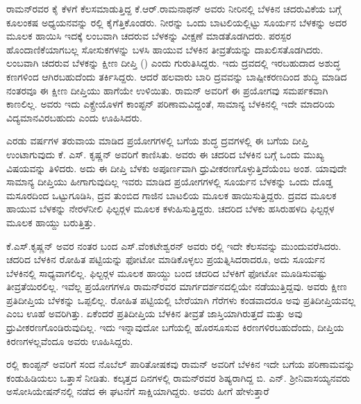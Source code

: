 
ರಾಮನ್‍ರವರ ಕೈ ಕೆಳಗೆ ಕೆಲಸಮಾಡುತ್ತಿದ್ದ ಕೆ.ಆರ್.ರಾಮನಾಥನ್ ಅವರು ನೀರಿನಲ್ಲಿ ಬೆಳಕಿನ ಚದರುವಿಕೆಯ ಬಗ್ಗೆ ಕೂಲಂಕಷ ಅಧ್ಯಯನವನ್ನು ರಲ್ಲಿ ಕೈಗೆತ್ತಿಕೊಂಡರು. ನೀರನ್ನು ಒಂದು ಬಾಟಲಿಯಲ್ಲಿಟ್ಟು ಸೂರ್ಯನ ಬೆಳಕನ್ನು ಅದರ ಮೂಲಕ ಹಾಯಿಸಿ ಇದಕ್ಕೆ ಲಂಬವಾಗಿ ಚದರುವ ಬೆಳಕನ್ನು ವೀಕ್ಷಣೆ ಮಾಡತೊಡಗಿದರು. ಪರಸ್ಪರ ಹೊಂದಾಣಿಕೆಯಾಗಬಲ್ಲ ಸೋಸುಕಗಳನ್ನು ಬಳಸಿ ಹಾಯುವ ಬೆಳಕಿನ ತೀವ್ರತೆಯನ್ನು ದಾಖಲಿಸತೊಡಗಿದರು. ಲಂಬವಾಗಿ ಚದರುವ ಬೆಳಕನ್ನು ಕ್ಷೀಣ ದೀಪ್ತಿ () ಎಂದು ಗುರುತಿಸಿದ್ದರು. ಇದು ದ್ರವದಲ್ಲಿ ಇರಬಹುದಾದ ಅಶುದ್ಧ ಕಣಗಳಿಂದ ಆಗಿರಬಹುದೆಂದು ತರ್ಕಿಸಿದ್ದರು. ಆದರೆ ಹಲವಾರು ಬಾರಿ ದ್ರವವನ್ನು ಬಾಷ್ಪೀಕರಣದಿಂದ ಶುದ್ಧಿ ಮಾಡಿದ ನಂತರವೂ ಈ ಕ್ಷೀಣ ದೀಪ್ತಿಯು ಹಾಗೆಯೇ ಉಳಿಯಿತು. ರಾಮನ್ ಅವರಿಗೆ ಈ ಪ್ರಯೋಗವು ಸಮರ್ಪಕವಾಗಿ ಕಾಣಲಿಲ್ಲ. ಅವರು ಇದು ಎಕ್ಸ್\enginline{-}ರೇಯೊಳಗೆ ಕಾಂಪ್ಟನ್ ಪರಿಣಾಮವಿದ್ದಂತೆ, ಸಾಮಾನ್ಯ ಬೆಳಕಿನಲ್ಲಿ ಇದೇ ಮಾದರಿಯ ವಿದ್ಯಮಾನವಿರಬಹುದು ಎಂದು ಊಹಿಸಿದರು.

ಎರಡು ವರ್ಷಗಳ ತರುವಾಯ ಮಾಡಿದ ಪ್ರಯೋಗಗಳಲ್ಲಿ  ಬಗೆಯ ಶುದ್ಧ ದ್ರವಗಳಲ್ಲಿ ಈ ಬಗೆಯ ದೀಪ್ತಿ ಉಂಟಾಗುವುದು ಕೆ. ಎಸ್. ಕೃಷ್ಣನ್ ಅವರಿಗೆ ಕಾಣಿಸಿತು. ಅವರು ಈ ಚದರಿದ ಬೆಳಕಿನ ಬಗ್ಗೆ ಒಂದು ಮುಖ್ಯ ವಿಷಯವನ್ನು ತಿಳಿದರು. ಅದು ಈ ದೀಪ್ತಿ ಬೆಳಕು ಅಪೂರ್ಣವಾಗಿ ಧ್ರುವೀಕರಣಗೊಳ್ಳುತ್ತಿದೆಯೆಂಬ ಅಂಶ. ಯಾವುದೇ ಸಾಮಾನ್ಯ ದೀಪ್ತಿಯು ಹೀಗಾಗುವುದಿಲ್ಲ ಇವರು ಮಾಡಿದ ಪ್ರಯೋಗಗಳಲ್ಲಿ ಸೂರ್ಯನ ಬೆಳಕನ್ನು ಒಂದು ದೊಡ್ಡ ಮಸೂರದಿಂದ ಒಟ್ಟುಗೂಡಿಸಿ, ದ್ರವ ತುಂಬಿದ ಗಾಜಿನ ಬಾಟಲಿಯ ಮೂಲಕ ಹಾಯಿಸುತ್ತಿದ್ದರು. ದ್ರವದ ಮೂಲಕ ಹಾಯುವ ಬೆಳಕನ್ನು ನೇರಳೆ\enginline{-}ನೀಲಿ ಫಿಲ್ಟರ್‍ಗಳ ಮೂಲಕ ಕಳುಹಿಸುತ್ತಿದ್ದರು. ಚದರಿದ ಬೆಳಕು ಹಸಿರು\enginline{-}ಹಳದಿ ಫಿಲ್ಟರ್‍ಗಳ ಮೂಲಕ ಹಾಯ್ದು ಬರುತ್ತಿತ್ತು.

ಕೆ.ಎಸ್.ಕೃಷ್ಣನ್ ಅವರ ನಂತರ ಬಂದ ಎಸ್.ವೆಂಕಟೇಶ್ವರನ್ ಅವರು ರಲ್ಲಿ ಇದೇ ಕೆಲಸವನ್ನು ಮುಂದುವರೆಸಿದರು. ಚದರಿದ ಬೆಳಕಿನ ರೋಹಿತ ಪಟ್ಟಿಯನ್ನು ಫೋಟೋ ಮಾಡಿಕೊಳ್ಳಲು ಪ್ರಯತ್ನಿಸಿದರಾದರೂ, ಅದು ಸೂರ್ಯನ ಬೆಳಕಿನಲ್ಲಿ ಸಾಧ್ಯವಾಗಲಿಲ್ಲ. ಫಿಲ್ಟರ್‍ಗಳ ಮೂಲಕ ಹಾಯ್ದು ಬಂದ ಚದರಿದ ಬೆಳಕಿಗೆ ಫೋಟೋ ಮೂಡಿಸುವಷ್ಟು ತೀವ್ರತೆಯಿರಲಿಲ್ಲ. ಇವೆಲ್ಲ ಪ್ರಯೋಗಗಳೂ ರಾಮನ್‍ರವರ ಮಾರ್ಗದರ್ಶನದಲ್ಲಿಯೇ ನಡೆಯುತ್ತಿದ್ದವು. ಅವರು ಕ್ಷೀಣ ಪ್ರತಿದೀಪ್ತಿಯ ಬೆಳಕನ್ನು ಒಪ್ಪಲಿಲ್ಲ. ರೋಹಿತ ಪಟ್ಟಿಯಲ್ಲಿ ಬೇರೆಯಾಗಿ ಗೆರೆಗಳು ಕಂಡವಾದರೂ ಅವು ಪ್ರತಿದೀಪ್ತಿಯವಲ್ಲ ಎಂಬ ಊಹೆ ಅವರಿಗಿತ್ತು. ಏಕೆಂದರೆ ಪ್ರತಿದೀಪ್ತಿಯ ಬೆಳಕಿನ ತೀವ್ರತೆ ಜಾಸ್ತಿಯಾಗಿರುತ್ತದೆ ಮತ್ತು ಅವು ಧ್ರುವೀಕರಣಗೊಂಡಿರುವುದಿಲ್ಲ. ಇದು ಇನ್ನಾವುದೋ ಬಗೆಯಲ್ಲಿ ಹೊರಸೂಸುವ ಕಿರಣಗಳಿರಬಹುದೆಂದು, ದೀಪ್ತಿಯ ಕಿರಣಗಳಲ್ಲವೆಂದೂ ಅವರು ಊಹಿಸಿದ್ದರು.

ರಲ್ಲಿ ಕಾಂಪ್ಟನ್ ಅವರಿಗೆ ಸಂದ ನೊಬೆಲ್ ಪಾರಿತೋಷಕವು ರಾಮನ್ ಅವರಿಗೆ ಬೆಳಕಿನ ಇದೇ ಬಗೆಯ ಪರಿಣಾಮವನ್ನು ಕಂಡುಹಿಡಿಯಲು ಒತ್ತಾಸೆ ನೀಡಿತು. ಕಲ್ಕತ್ತದ ದಿನಗಳಲ್ಲಿ ರಾಮನ್‍ರವರ ಶಿಷ್ಯರಾಗಿದ್ದ ಬಿ. ಎನ್. ಶ‍್ರೀನಿವಾಸಯ್ಯನವರು ಅಸೋಸಿಯೇಷನ್‍ನಲ್ಲಿ ನಡೆದ ಈ ಘಟನೆಗೆ ಸಾಕ್ಷಿಯಾಗಿದ್ದರು. ಅವರು ಹೀಗೆ ಹೇಳುತ್ತಾರೆ\enginline{-}

